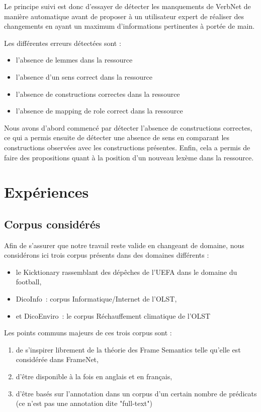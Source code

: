 Le principe suivi est donc d'essayer de détecter les manquements de VerbNet de
manière automatique avant de proposer à un utilisateur expert de réaliser des
changements en ayant un maximum d'informations pertinentes à portée de main.

Les différentes erreurs détectées sont :
\begin{itemize}
    \item l'absence de lemmes dans la ressource
    \item l'absence d'un sens correct dans la ressource
    \item l'absence de constructions correctes dans la ressource
    \item l'absence de mapping de role correct dans la ressource
\end{itemize}

Nous avons d'abord commencé par détecter l'absence de constructions correctes,
ce qui a permis ensuite de détecter une absence de sens en comparant les
constructions observées avec les constructions présentes. Enfin, cela a permis
de faire des propositions quant à la position d'un nouveau lexème dans la
ressource.

\section{Expériences}


\subsection{Corpus considérés}

Afin de s'assurer que notre travail reste valide en changeant de domaine, nous
considérons ici trois corpus présents dans des domaines différents :

\begin{itemize}
    \item le Kicktionary rassemblant des dépêches de l'UEFA dans le domaine du football,
    \item DicoInfo~: corpus Informatique/Internet de l'OLST,
    \item et DicoEnviro~: le corpus Réchauffement climatique de l'OLST
\end{itemize}

Les points communs majeurs de ces trois corpus sont :
\begin{enumerate}
    \item de s'inspirer librement de la théorie des Frame Semantics telle qu'elle est considérée dans FrameNet,
    \item d'être disponible à la fois en anglais et en français,
    \item d'être basés sur l'annotation dans un corpus d'un certain nombre de prédicats (ce n'est pas une annotation dite "full-text")
\end{enumerate}

